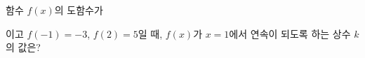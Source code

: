 함수 $f(x)$의 도함수가\par\smallskip{}\par\smallskip\noindent 이고 $f(-1)=-3$, $f(2)=5$일 때, $f(x)$가 $x=1$에서 연속이 되도록 하는 상수 $k$의 값은?
